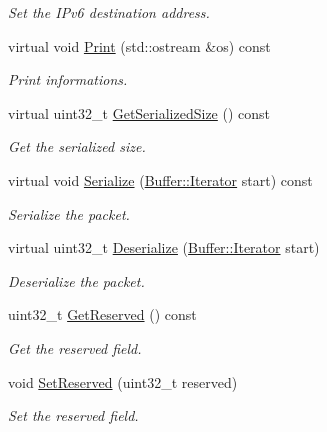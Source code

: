 \begin{DoxyCompactItemize}
\begin{DoxyCompactList}\small\item\em Set the I\+Pv6 destination address. \end{DoxyCompactList}\item 
virtual void \hyperlink{classns3_1_1Icmpv6Redirection_a7437c6575b96ec9f05fe35bbad730dca}{Print} (std\+::ostream \&os) const 
\begin{DoxyCompactList}\small\item\em Print informations. \end{DoxyCompactList}\item 
virtual uint32\+\_\+t \hyperlink{classns3_1_1Icmpv6Redirection_a2bfaf14a0376508f8fc1bd5e9bed6196}{Get\+Serialized\+Size} () const 
\begin{DoxyCompactList}\small\item\em Get the serialized size. \end{DoxyCompactList}\item 
virtual void \hyperlink{classns3_1_1Icmpv6Redirection_a3d278de1bcf39046510795bd78a4acfa}{Serialize} (\hyperlink{classns3_1_1Buffer_1_1Iterator}{Buffer\+::\+Iterator} start) const 
\begin{DoxyCompactList}\small\item\em Serialize the packet. \end{DoxyCompactList}\item 
virtual uint32\+\_\+t \hyperlink{classns3_1_1Icmpv6Redirection_abcfbc9f63e544250bb40c302c0537788}{Deserialize} (\hyperlink{classns3_1_1Buffer_1_1Iterator}{Buffer\+::\+Iterator} start)
\begin{DoxyCompactList}\small\item\em Deserialize the packet. \end{DoxyCompactList}\item 
uint32\+\_\+t \hyperlink{classns3_1_1Icmpv6Redirection_a15ebbd5f1f3794f720bc62218ba83627}{Get\+Reserved} () const 
\begin{DoxyCompactList}\small\item\em Get the reserved field. \end{DoxyCompactList}\item 
void \hyperlink{classns3_1_1Icmpv6Redirection_aafab884fedafc79798c719babf4e098b}{Set\+Reserved} (uint32\+\_\+t reserved)
\begin{DoxyCompactList}\small\item\em Set the reserved field. \end{DoxyCompactList}\end{DoxyCompactItemize}
